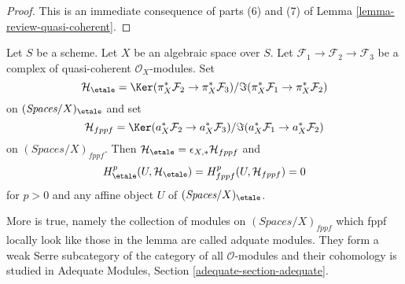 \begin{proof}
This is an immediate consequence of parts (6) and (7) of
Lemma \ref{lemma-review-quasi-coherent}.
\end{proof}

\begin{lemma}
\label{lemma-vanishing-adequate}
Let $S$ be a scheme. Let $X$ be an algebraic space over $S$.
Let $\mathcal{F}_1 \to \mathcal{F}_2 \to \mathcal{F}_3$
be a complex of quasi-coherent $\mathcal{O}_X$-modules.
Set
$$
\mathcal{H}_\etale =
\Ker(\pi_X^*\mathcal{F}_2 \to \pi_X^*\mathcal{F}_3)/
\Im(\pi_X^*\mathcal{F}_1 \to \pi_X^*\mathcal{F}_2)
$$
on $(\textit{Spaces}/X)_\etale$ and set
$$
\mathcal{H}_{fppf} =
\Ker(a_X^*\mathcal{F}_2 \to a_X^*\mathcal{F}_3)/
\Im(a_X^*\mathcal{F}_1 \to a_X^*\mathcal{F}_2)
$$
on $(\textit{Spaces}/X)_{fppf}$.
Then $\mathcal{H}_\etale = \epsilon_{X, *}\mathcal{H}_{fppf}$
and
$$
H^p_\etale(U, \mathcal{H}_\etale) = H^p_{fppf}(U, \mathcal{H}_{fppf}) = 0
$$
for $p > 0$ and any affine object $U$ of $(\textit{Spaces}/X)_\etale$.
\end{lemma}

\noindent
More is true, namely the collection of modules on
$(\textit{Spaces}/X)_{fppf}$ which fppf locally look like those
in the lemma are called adquate modules. They form a
weak Serre subcategory of the category of all $\mathcal{O}$-modules
and their cohomology is studied in
Adequate Modules, Section \ref{adequate-section-adequate}.

